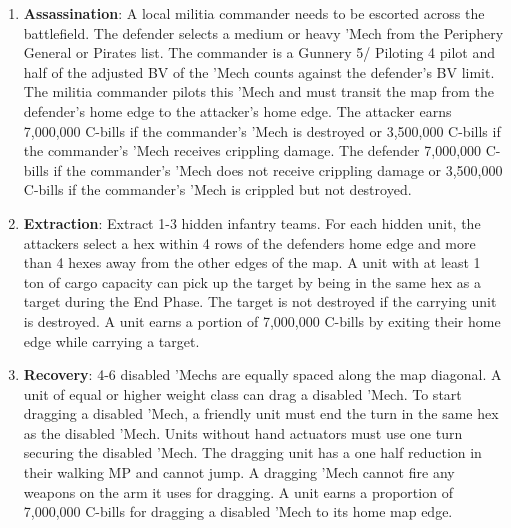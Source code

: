 \begin{enumerate}
\item {\bfseries Assassination}: A local militia commander needs to be escorted across the battlefield.
The defender selects a medium or heavy 'Mech from the Periphery General or Pirates list.
The commander is a Gunnery 5/ Piloting 4 pilot and half of the adjusted BV of the 'Mech counts against the defender's BV limit.
The militia commander pilots this 'Mech and must transit the map from the defender's home edge to the attacker's home edge.
The attacker earns 7,000,000 C-bills if the commander's 'Mech is destroyed or 3,500,000 C-bills if the commander's 'Mech receives crippling damage.
The defender 7,000,000 C-bills if the commander's 'Mech does not receive crippling damage  or 3,500,000 C-bills if the commander's 'Mech is crippled but not destroyed.

\item {\bfseries Extraction}: Extract 1-3 hidden infantry teams.
For each hidden unit, the attackers select a hex within 4 rows of the defenders home edge and more than 4 hexes away from the other edges of the map.
A unit with at least 1 ton of cargo capacity can pick up the target by being in the same hex as a target during the End Phase.
The target is not destroyed if the carrying unit is destroyed.
A unit earns a portion of 7,000,000 C-bills by exiting their home edge while carrying a target.

\item {\bfseries Recovery}: 4-6 disabled 'Mechs are equally spaced along the map diagonal.
A unit of equal or higher weight class can drag a disabled 'Mech.
To start dragging a disabled 'Mech, a friendly unit must end the turn in the same hex as the disabled 'Mech.
Units without hand actuators must use one turn securing the disabled 'Mech.
The dragging unit has a one half reduction in their walking MP and cannot jump.
A dragging 'Mech cannot fire any weapons on the arm it uses for dragging.
A unit earns a proportion of 7,000,000 C-bills for dragging a disabled 'Mech to its home map edge.

\end{enumerate}
